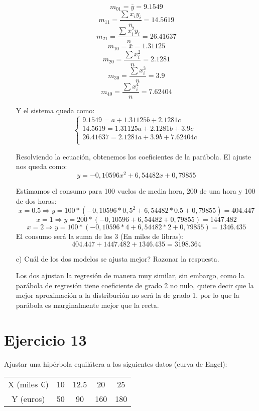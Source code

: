 \documentclass[a4paper,12pt]{article}
\begin{document}
\begin{enumerate}
    $$m_{01} = \bar y = 9.1549$$
    $$m_{11} = \frac {\sum x_iy_i}{n}= 14.5619$$
    $$m_{21} = \frac {\sum x_i^2y_i}{n} =26.41637$$
    $$m_{10} = \bar x= 1.31125$$
    $$m_{20} = \frac {\sum x_i^2}{n}=2.1281$$
    $$m_{30} = \frac {\sum x_i^3}{n}=3.9$$
    $$m_{40} = \frac {\sum x_i^4}{n}= 7.62404$$

    Y el sistema queda como:
    \begin{equation}
    \left\{
    \begin{array}{l}
    9.1549 = a + 1.31125b + 2.1281c \\
    14.5619 = 1.31125a + 2.1281b + 3.9c\\
    26.41637 =  2.1281a +3.9b + 7.62404c\\
    \end{array}
    \right.
    \end{equation}

    Resolviendo la ecuación, obtenemos los coeficientes de la parábola. El ajuste nos queda como:
    $$y= -0,10596x^2 + 6,54482x +0,79855$$

    Estimamos el consumo para 100 vuelos de media hora, 200 de una hora y 100 de dos horas:
    $$x=0.5 \Rightarrow y= 100*(-0,10596*0,5^2 + 6,54482*0.5 +0,79855)= 404.447$$
    $$x=1 \Rightarrow y= 200*(-0,10596 + 6,54482 +0,79855)=1447.482$$
    $$x=2 \Rightarrow y= 100*(-0,10596*4 + 6,54482*2 +0,79855)=1346.435$$
    El consumo será la suma de los 3 (En miles de libras):
    $$404.447+1447.482+1346.435= 3198.364$$
    
    \item[c)] \textquestiondown Cuál de los dos modelos se ajusta mejor? Razonar la respuesta.

    Los dos ajustan la regresión de manera muy similar, sin embargo, como la parábola de regresión tiene coeficiente de grado 2 no nulo, quiere decir que la mejor aproximación a la distribución no será la de grado 1, por lo que la parábola es marginalmente mejor que la recta.
    
\end{enumerate}

\section*{Ejercicio 13}
Ajustar una hipérbola equilátera a los siguientes datos (curva de Engel):
\begin{center}
\begin{tabular}{c|cccc}
X (miles €) & 10 & 12.5 & 20 & 25 \\
Y (euros) & 50 & 90 & 160 & 180 \\
\end{tabular}
\end{center}
\end{document}

